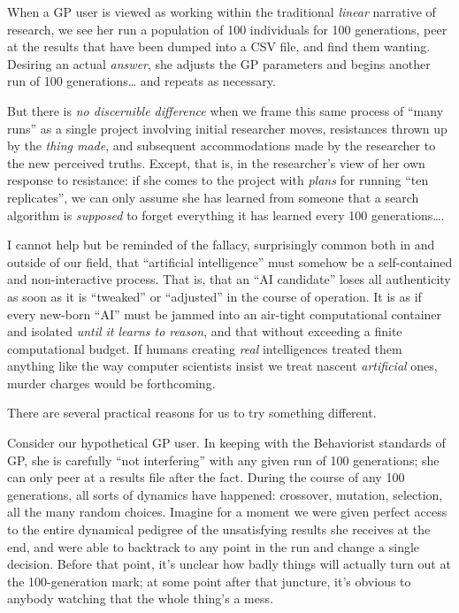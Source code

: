 When a GP user is viewed as working within the traditional \emph{linear} narrative of research, we see her run a population of 100 individuals for 100 generations, peer at the results that have been dumped into a CSV file, and find them wanting. Desiring an actual \emph{answer}, she adjusts the GP parameters and begins another run of 100 generations\ldots{} and repeats as necessary.

But there is \emph{no discernible difference} when we frame this same process of ``many runs'' as a single project involving initial researcher moves, resistances thrown up by the \emph{thing made}, and subsequent accommodations made by the researcher to the new perceived truths. Except, that is, in the researcher's view of her own response to resistance: if she comes to the project with \emph{plans} for running ``ten replicates'', we can only assume she has learned from someone that a search algorithm is \emph{supposed} to forget everything it has learned every 100 generations\ldots{}.

I cannot help but be reminded of the fallacy, surprisingly common both in and outside of our field, that ``artificial intelligence'' must somehow be a self-contained and non-interactive process. That is, that an ``AI candidate'' loses all authenticity as soon as it is ``tweaked'' or ``adjusted'' in the course of operation. It is as if every new-born ``AI'' must be jammed into an air-tight computational container and isolated \emph{until it learns to reason}, and that without exceeding a finite computational budget. If humans creating \emph{real} intelligences treated them anything like the way computer scientists insist we treat nascent \emph{artificial} ones, murder charges would be forthcoming.

There are several practical reasons for us to try something different.

Consider our hypothetical GP user. In keeping with the Behaviorist standards of GP, she is carefully ``not interfering'' with any given run of 100 generations; she can only peer at a results file after the fact. During the course of any 100 generations, all sorts of dynamics have happened: crossover, mutation, selection, all the many random choices. Imagine for a moment we were given perfect access to the entire dynamical pedigree of the unsatisfying results she receives at the end, and were able to backtrack to any point in the run and change a single decision. Before that point, it's unclear how badly things will actually turn out at the 100-generation mark; at some point after that juncture, it's obvious to anybody watching that the whole thing's a mess.

